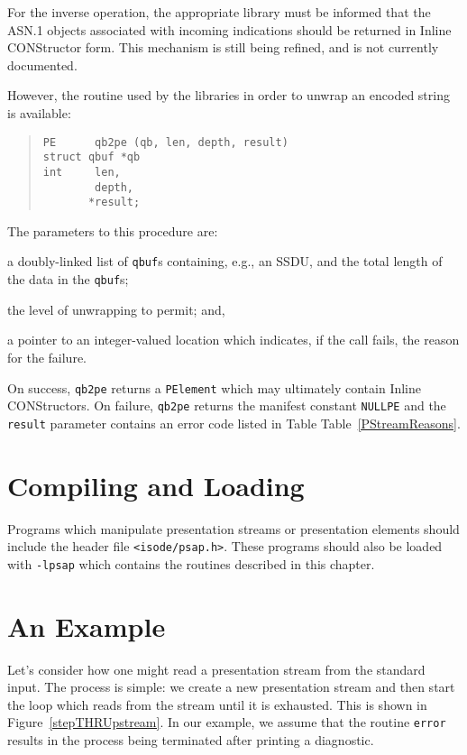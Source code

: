 For the inverse operation,
the appropriate library must be informed that the ASN.1 objects associated
with incoming indications should be returned in Inline CONStructor form.
This mechanism is still being refined,
and is not currently documented.

However, the routine used by the libraries in order to unwrap an encoded
string is available:
\begin{quote}\small\begin{verbatim}
PE      qb2pe (qb, len, depth, result)
struct qbuf *qb
int     len,
        depth,
       *result;
\end{verbatim}\end{quote}
The parameters to this procedure are:
\begin{describe}
\item[\verb"qb"/\verb"len":] a doubly-linked list of \verb"qbuf"s containing,
e.g., an SSDU, and the total length of the data in the \verb"qbuf"s;

\item[\verb"depth":] the level of unwrapping to permit;
and,

\item[\verb"result":] a pointer to an integer-valued location which indicates,
if the call fails, the reason for the failure.
\end{describe}
On success,
\verb"qb2pe" returns a \verb"PElement" which may ultimately contain
Inline CONStructors.
On failure,
\verb"qb2pe" returns the manifest constant \verb"NULLPE" and the
\verb"result" parameter contains an error code listed in Table
Table~\ref{PStreamReasons}.

\section	{Compiling and Loading}
Programs which manipulate presentation streams or presentation elements
should include the header file \verb"<isode/psap.h>".
These programs should also be loaded with \verb"-lpsap" which contains the
routines described in this chapter.

\section	{An Example}
Let's consider how one might read a presentation stream 
from the standard input.
The process is simple:
we create a new presentation stream and then start the loop which reads
from the stream until it is exhausted.
This is shown in Figure~\ref{stepTHRUpstream}.
In our example,
we assume that the routine \verb"error" results in the process being
terminated after printing a diagnostic.

